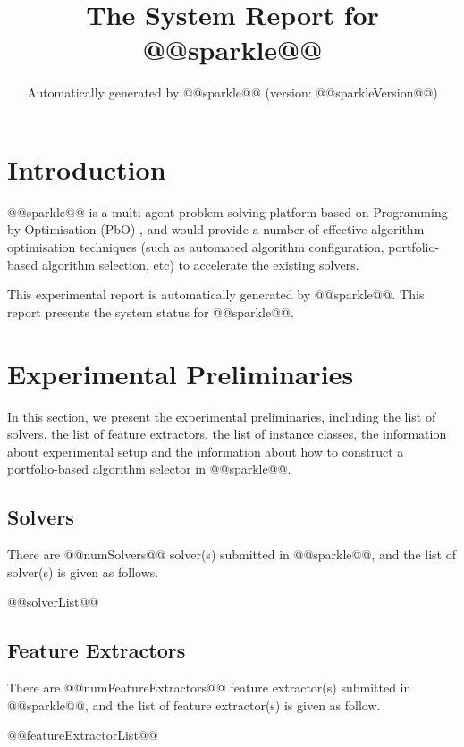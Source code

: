 \documentclass[british]{article}
\title{The System Report for @@sparkle@@ }
\author{ Automatically generated by @@sparkle@@ (version: @@sparkleVersion@@) }
\begin{document}
\maketitle %


\section{Introduction}
\label{sec:Introduction}

@@sparkle@@ \cite{Hoos15} is a multi-agent problem-solving platform based on Programming by Optimisation (PbO) \cite{Hoos12}, and would provide a number of effective algorithm optimisation techniques (such as automated algorithm configuration, portfolio-based algorithm selection, etc) to accelerate the existing solvers.

This experimental report is automatically generated by @@sparkle@@. This report presents the system status for @@sparkle@@.


\section{Experimental Preliminaries}
\label{sec:Experimental_Preliminaries}

In this section, we present the experimental preliminaries, including the list of solvers, the list of feature extractors, the list of instance classes, the information about experimental setup and the information about how to construct a portfolio-based algorithm selector in @@sparkle@@.

\subsection{Solvers}
\label{sec:Solvers}
There are @@numSolvers@@ solver(s) submitted in @@sparkle@@, and the list of solver(s) is given as follows.


\begin{enumerate} 
@@solverList@@
\end{enumerate}


\subsection{Feature Extractors}
\label{sec:Feature_Extractors}
There are @@numFeatureExtractors@@ feature extractor(s) submitted in @@sparkle@@, and the list of feature extractor(s) is given as follow.

\begin{enumerate}
@@featureExtractorList@@
\end{enumerate}
\end{document}

